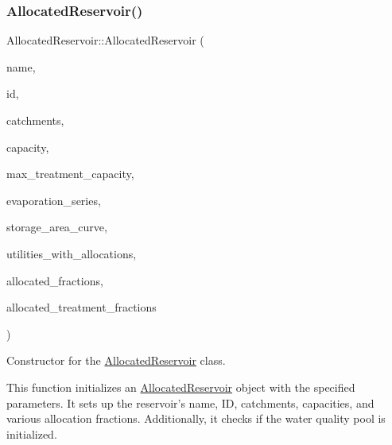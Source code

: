 \subsubsection{\texorpdfstring{Allocated\+Reservoir()}{AllocatedReservoir()}\hspace{0.1cm}{\footnotesize\ttfamily [1/5]}}
{\footnotesize\ttfamily Allocated\+Reservoir\+::\+Allocated\+Reservoir (\begin{DoxyParamCaption}\item[{const char $\ast$}]{name,  }\item[{const int}]{id,  }\item[{const vector$<$ \mbox{\hyperlink{classCatchment}{Catchment}} $\ast$$>$ \&}]{catchments,  }\item[{const double}]{capacity,  }\item[{const double}]{max\+\_\+treatment\+\_\+capacity,  }\item[{Evaporation\+Series \&}]{evaporation\+\_\+series,  }\item[{Data\+Series $\ast$}]{storage\+\_\+area\+\_\+curve,  }\item[{vector$<$ int $>$ $\ast$}]{utilities\+\_\+with\+\_\+allocations,  }\item[{vector$<$ double $>$ $\ast$}]{allocated\+\_\+fractions,  }\item[{vector$<$ double $>$ $\ast$}]{allocated\+\_\+treatment\+\_\+fractions }\end{DoxyParamCaption})}



Constructor for the \mbox{\hyperlink{classAllocatedReservoir}{Allocated\+Reservoir}} class. 

This function initializes an \mbox{\hyperlink{classAllocatedReservoir}{Allocated\+Reservoir}} object with the specified parameters. It sets up the reservoir’s name, ID, catchments, capacities, and various allocation fractions. Additionally, it checks if the water quality pool is initialized.


